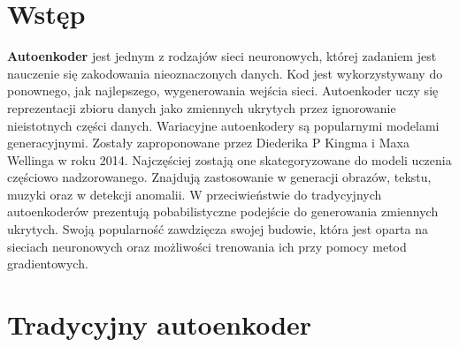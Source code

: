 \documentclass[a4paper,12pt]{book} %
\begin{document}
\sloppy



\thispagestyle{empty}




\tableofcontents{}

\chapter*{Wstęp} %
\textbf{Autoenkoder} jest jednym z rodzajów sieci neuronowych, której zadaniem jest nauczenie się zakodowania nieoznaczonych danych. Kod jest wykorzystywany do ponownego, jak najlepszego, wygenerowania wejścia sieci. Autoenkoder uczy się reprezentacji zbioru danych jako zmiennych ukrytych przez ignorowanie nieistotnych części danych.
Wariacyjne autoenkodery są popularnymi modelami generacyjnymi. Zostały zaproponowane przez Diederika P Kingma i Maxa Wellinga w roku 2014.\cite{kingma2014autoencoding} Najczęściej zostają one skategoryzowane do modeli uczenia częściowo nadzorowanego. Znajdują zastosowanie w generacji obrazów, tekstu, muzyki oraz w detekcji anomalii. W przeciwieństwie do tradycyjnych autoenkoderów prezentują pobabilistyczne podejście do generowania zmiennych ukrytych. Swoją popularność zawdzięcza swojej budowie, która jest oparta na sieciach neuronowych oraz możliwości trenowania ich przy pomocy metod gradientowych.
\chapter{Tradycyjny autoenkoder} 
\end{document}
